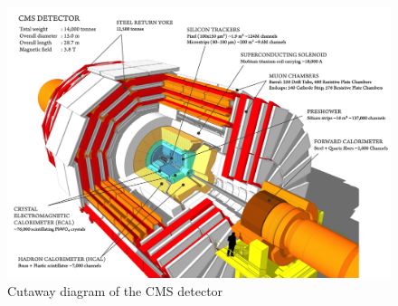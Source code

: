 \documentclass[oneside,9pt]{memoir}
\begin{document}




\tableofcontents
\thispagestyle{empty}



\begin{figure}
\centerline{
	\includegraphics[width=0.75\paperwidth]{cms_160312_06b}}
	\caption{Cutaway diagram of the CMS detector \cite{Sakuma_2014}}

\end{figure}



\end{document}
